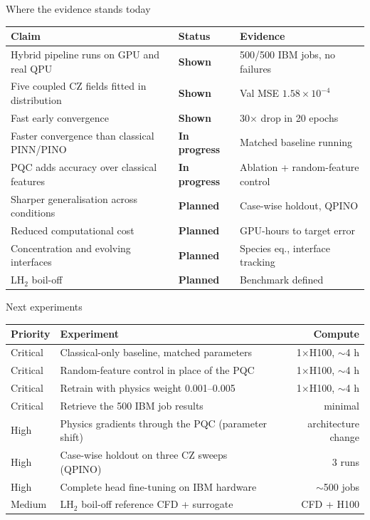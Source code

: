 \documentclass[aspectratio=169]{beamer}
\newcommand{\shown}{\textcolor{okgreen}{\textbf{Shown}}}
\newcommand{\pending}{\textcolor{warnorange}{\textbf{In progress}}}
\newcommand{\planned}{\textcolor{phgray}{\textbf{Planned}}}
\begin{document}
\begin{frame}{Where the evidence stands today}
\renewcommand{\arraystretch}{1.1}
\footnotesize
\begin{tabular}{p{} p{} p{}}
\toprule
Claim & Status & Evidence \\
\midrule
Hybrid pipeline runs on GPU and real QPU & \shown & 500/500 IBM jobs, no failures \\
Five coupled CZ fields fitted in distribution & \shown & Val MSE $1.58\times10^{-4}$ \\
Fast early convergence & \shown & 30$\times$ drop in 20 epochs \\
Faster convergence than classical PINN/PINO & \pending & Matched baseline running \\
PQC adds accuracy over classical features & \pending & Ablation + random-feature control \\
Sharper generalisation across conditions & \planned & Case-wise holdout, QPINO \\
Reduced computational cost & \planned & GPU-hours to target error \\
Concentration and evolving interfaces & \planned & Species eq., interface tracking \\
LH$_2$ boil-off & \planned & Benchmark defined \\
\bottomrule
\end{tabular}
\end{frame}

\begin{frame}{Next experiments}
\renewcommand{\arraystretch}{1.1}
\small
\begin{tabular}{llr}
\toprule
Priority & Experiment & Compute \\
\midrule
Critical & Classical-only baseline, matched parameters & 1$\times$H100, $\sim$4 h \\
Critical & Random-feature control in place of the PQC & 1$\times$H100, $\sim$4 h \\
Critical & Retrain with physics weight 0.001--0.005 & 1$\times$H100, $\sim$4 h \\
Critical & Retrieve the 500 IBM job results & minimal \\
High & Physics gradients through the PQC (parameter shift) & architecture change \\
High & Case-wise holdout on three CZ sweeps (QPINO) & 3 runs \\
High & Complete head fine-tuning on IBM hardware & $\sim$500 jobs \\
Medium & LH$_2$ boil-off reference CFD + surrogate & CFD + H100 \\
\bottomrule
\end{tabular}
\end{frame}
\end{document}
